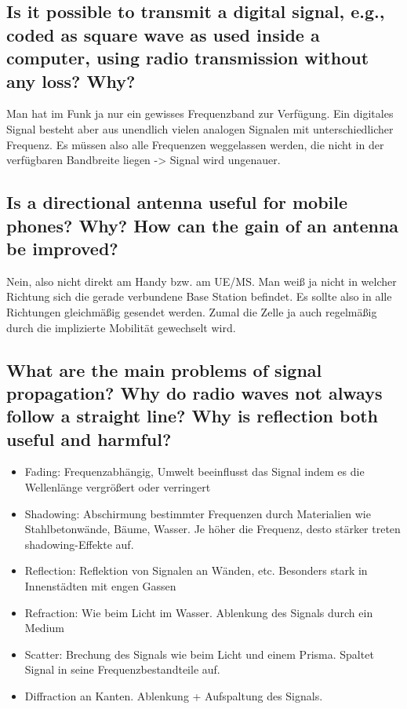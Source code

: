\subsection{Is it possible to transmit a digital signal, e.g., coded as square wave as used inside a
computer, using radio transmission without any loss? Why?}
Man hat im Funk ja nur ein gewisses Frequenzband zur Verfügung. Ein digitales Signal besteht aber aus unendlich vielen analogen Signalen mit unterschiedlicher Frequenz. Es müssen also alle Frequenzen weggelassen werden, die nicht in der verfügbaren Bandbreite liegen -> Signal wird ungenauer.

\subsection{Is a directional antenna useful for mobile phones? Why? How can the gain of an
antenna be improved?} 
Nein, also nicht direkt am Handy bzw. am UE/MS. Man weiß ja nicht in welcher Richtung sich die gerade verbundene Base Station befindet. Es sollte also in alle Richtungen gleichmäßig gesendet werden. Zumal die Zelle ja auch regelmäßig durch die implizierte Mobilität gewechselt wird.

\subsection{What are the main problems of signal propagation? Why do radio waves not always
follow a straight line? Why is reflection both useful and harmful?}
\begin{itemize}

\item Fading: Frequenzabhängig, Umwelt beeinflusst das Signal indem es die Wellenlänge vergrößert oder verringert

\item Shadowing: Abschirmung bestimmter Frequenzen durch Materialien wie Stahlbetonwände, Bäume, Wasser. Je höher die Frequenz, desto stärker treten shadowing-Effekte auf.

\item Reflection: Reflektion von Signalen an Wänden, etc. Besonders stark in Innenstädten mit engen Gassen

\item Refraction: Wie beim Licht im Wasser. Ablenkung des Signals durch ein Medium

\item Scatter: Brechung des Signals wie beim Licht und einem Prisma. Spaltet Signal in seine Frequenzbestandteile auf.

\item Diffraction an Kanten. Ablenkung + Aufspaltung des Signals.

\end{itemize}

